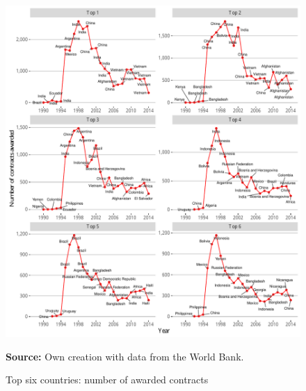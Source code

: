 \begin{figure}[H]
\begin{center}
\caption{Top six countries: number of awarded contracts}
\label{fig_major_num_awarded_top}
\includegraphics[max width=.95\textwidth]{../img/major_historic_top_contracts_awarded.pdf}
\end{center}
\noindent \footnotesize{\textbf{Source:} Own creation with data from the World Bank.}
\end{figure}



